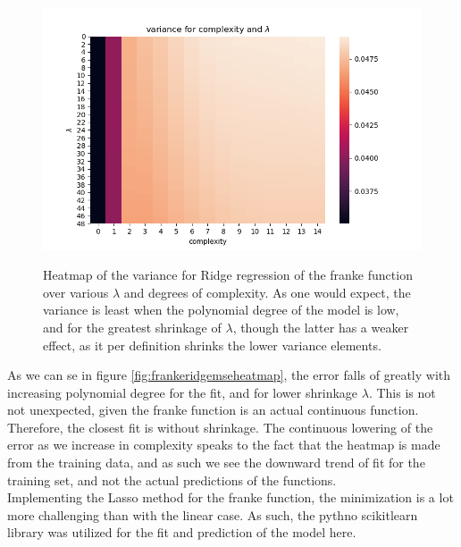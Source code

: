 \documentclass[ 12pt, a4paper ]{article}
\begin{document}
\begin{figure}
\includegraphics[scale=0.5]{frankeridgevarianceheatmap.png}
\label{fig:frankeridgevarianceheatmap}
\caption{
    Heatmap of the variance for Ridge regression of the franke function over various 
    $\lambda$ and degrees of complexity. As one would expect, the variance is least when 
    the polynomial degree of the model is low, and for the greatest shrinkage of $\lambda$, 
    though the latter has a weaker effect, as it per definition shrinks the lower variance 
    elements. 
}
\end{figure}

As we can se in figure \ref{fig:frankeridgemseheatmap}, the error falls of greatly with
increasing polynomial degree for the fit, and for lower shrinkage $\lambda$. This is not
not unexpected, given the franke function is an actual continuous function. Therefore, the
closest fit is without shrinkage. The continuous lowering of the error as we increase in
complexity speaks to the fact that the heatmap is made from the training data, and as such 
we see the downward trend of fit for the training set, and not the actual predictions of the 
functions. \\

Implementing the Lasso method for the franke function, the minimization is a lot more challenging
than with the linear case. As such, the pythno scikitlearn library was utilized for the fit and
prediction of the model here. 
\end{document}
